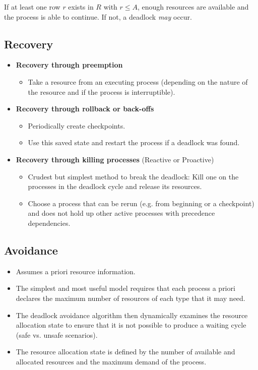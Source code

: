 	                If at least one row \(r\) exists in \(R\) with \( r \leq A \), enough resources are available and the process is able to continue. If not, a deadlock \textit{may} occur.

        \subsection{Recovery}
            \begin{itemize}
            	\item \textbf{Recovery through preemption}
                	\begin{itemize}
                		\item Take a resource from an executing process (depending on the nature of the resource and if the process is interruptible).
                	\end{itemize}
            	\item \textbf{Recovery through rollback or back-offs}
                	\begin{itemize}
                		\item Periodically create checkpoints.
                		\item Use this saved state and restart the process if a deadlock was found.
                	\end{itemize}
            	\item \textbf{Recovery through killing processes} (Reactive or Proactive)
                	\begin{itemize}
                		\item Crudest but simplest method to break the deadlock: Kill one on the processes in the deadlock cycle and release its resources.
                		\item Choose a process that can be rerun (e.g. from beginning or a checkpoint) and does not hold up other active processes with precedence dependencies.
                	\end{itemize}
            \end{itemize}

        \subsection{Avoidance}
            \begin{itemize}
            	\item Assumes a priori resource information.
            	\item The simplest and most useful model requires that each process a priori declares the maximum number of resources of each type that it may need.
            	\item The deadlock avoidance algorithm then dynamically examines the resource allocation state to ensure that it is not possible to produce a waiting cycle (safe vs. unsafe scenarios).
            	\item The resource allocation state is defined by the number of available and allocated resources and the maximum demand of the process.
            \end{itemize}
        
